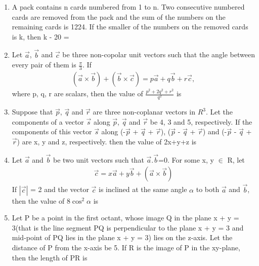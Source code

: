 \begin{enumerate}[label=\arabic*.,ref=\thesubsection.\theenumi]
\item A pack contains n cards numbered from 1 to n. Two consecutive numbered cards are removed from the pack and the sum of the numbers on the remaining cards is 1224. If the smaller of the numbers on the removed cards is k, then k - 20 = 

\item Let $\overrightarrow{a}$, $\overrightarrow{b}$ and $\overrightarrow{c}$ be three non-copolar unit vectors such that the angle between every pair of them is $\frac{\pi}{3}$. If 
\begin{align*}
(\overrightarrow{a} \times \overrightarrow{b}) + (\overrightarrow{b} \times \overrightarrow{c}) = p\overrightarrow{a} + q\overrightarrow{b} + r\overrightarrow{c},
\end{align*}
where p, q, r are scalars, then the value of $\frac{p^{2} + 2q^{2} + r^{2}}{q^{2}}$ is

\item Suppose that $\overrightarrow{p}$, $\overrightarrow{q}$ and $\overrightarrow{r}$ are three non-coplanar vectors in $R^{3}$. Let the components of a vector $\overrightarrow{s}$ along $\overrightarrow{p}$, $\overrightarrow{q}$ and 
$\overrightarrow{r}$ be 4, 3 and 5, respectively. If the components of this vector $\overrightarrow{s}$ along 
(-$\overrightarrow{p}$ + $\overrightarrow{q}$ + $\overrightarrow{r}$), ($\overrightarrow{p}$ - $\overrightarrow{q}$ + $\overrightarrow{r}$) and (-$\overrightarrow{p}$ - $\overrightarrow{q}$ + $\overrightarrow{r}$) are x, y and z, respectively. then the value of 2x+y+z is

\item Let $\overrightarrow{a}$ and $\overrightarrow{b}$ be two unit vectors such that $\overrightarrow{a}$.$\overrightarrow{b}$=0. For some x, y $\in$ R, let 
\begin{align*}
\overrightarrow{c} = x\overrightarrow{a} + y\overrightarrow{b} + (\overrightarrow{a} \times \overrightarrow{b})
\end{align*}
If $|\overrightarrow{c}|$ = 2 and the vector $\overrightarrow{c}$ is inclined at the same angle $\alpha$ to both $\overrightarrow{a}$ and $\overrightarrow{b}$, then the value of 8$\cos^{2}\alpha$ is

\item Let P be a point in the first octant, whose image Q in the plane x + y = 3(that is the line segment PQ is perpendicular to the plane x + y = 3 and mid-point of PQ lies in the plane x + y = 3) lies on the z-axis. Let the distance of P from the x-axis be 5. If R is the image of P in the xy-plane, then the length of PR is


\end{enumerate}
